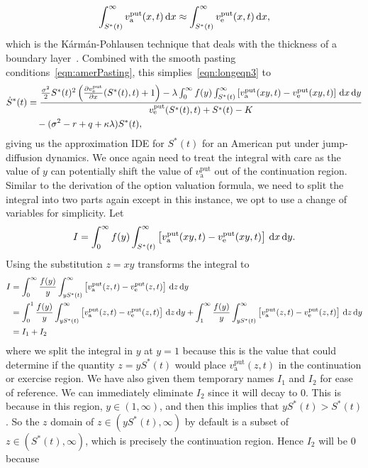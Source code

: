 			\begin{equation}
				\label{eqn:assump}
				\int_{S^*(t)}^\infty v_{\text{a}}^{\text{put}}(x,t) \, \mathrm d x \approx \int_{S^*(t)}^\infty  v_{\text{e}}^{\text{put}}(x,t) \, \mathrm d x,
			\end{equation}
		 which is the K\'arm\'an-Pohlausen technique that deals with the thickness of a boundary layer~\cite[pp. 421--423]{Zwillinger1998}. Combined with the smooth pasting conditions~\eqref{eqn:amerPasting}, this simplies~\eqref{eqn:longeqn3} to
			\begin{equation}
				\label{eqn:longeqn4}
				\begin{split}
				\dot{S}^*(t) &= \frac{\frac{\sigma^2}{2}S^*(t)^2\left( \frac{\partial  v_{\text{e}}^{\text{put}} }{\partial x}(S^*(t),t) + 1\right) - \lambda\int_0^\infty f(y) \int_{S^*(t)}^\infty \left[ v_{\text{a}}^{\text{put}}(xy,t) -  v_{\text{e}}^{\text{put}}(xy,t) \right] \, \mathrm d x \, \mathrm d y}{ v_{\text{e}}^{\text{put}}(S^*(t),t) + S^*(t) - K} \\
				&\quad{} - (\sigma^2 - r + q +\kappa\lambda)S^*(t),
				\end{split}
			\end{equation}
			giving us the approximation IDE for $S^*(t)$ for an American put under jump-diffusion dynamics. We once again need to treat the integral with care as the value of $y$ can potentially shift the value of $v_{\text{a}}^{\text{put}}$ out of the continuation region. Similar to the derivation of the option valuation formula, we need to split the integral into two parts again except in this instance, we opt to use a change of variables for simplicity. Let
				$$
					I = \int_0^\infty f(y) \int_{S^*(t)}^\infty \left[ v_{\text{a}}^{\text{put}}(xy,t) -  v_{\text{e}}^{\text{put}}(xy,t) \right] \, \mathrm d x \, \mathrm d y.
				$$ 
	Using the substitution $z = xy$ transforms the integral to
			\begin{align*}
				I &= \int_0^\infty \frac{f(y)}{y}\int_{yS^*(t)}^\infty \left[ v_{\text{a}}^{\text{put}}(z,t) -  v_{\text{e}}^{\text{put}}(z,t) \right] \, \mathrm d z\, \mathrm d y \\
				&= \int_0^1 \frac{f(y)}{y} \int_{yS^*(t)}^\infty \left[ v_{\text{a}}^{\text{put}}(z,t) -  v_{\text{e}}^{\text{put}}(z,t) \right] \, \mathrm d z\, \mathrm d y + \int_1^\infty\frac{f(y)}{y} \int_{yS^*(t)}^\infty \left[ v_{\text{a}}^{\text{put}}(z,t) -  v_{\text{e}}^{\text{put}}(z,t) \right] \, \mathrm d z\, \mathrm d y \\
				&= I_1 + I_2
			\end{align*}
	where we split the integral in $y$ at $y=1$ because this is the value that could determine if the quantity $z = yS^*(t)$ would place $v_{\text{a}}^{\text{put}}(z,t)$ in the continuation or exercise region. We have also given them temporary names $I_1$ and $I_2$ for ease of reference. We can immediately eliminate $I_2$ since it will decay to 0. This is because in this region, $y \in (1,\infty)$, and then this implies that $yS^*(t) > S^*(t)$. So the $z$ domain of $z \in (yS^*(t),\infty)$ by default is a subset of $z \in (S^*(t),\infty)$, which is precisely the continuation region. Hence $I_2$ will be 0 because 
